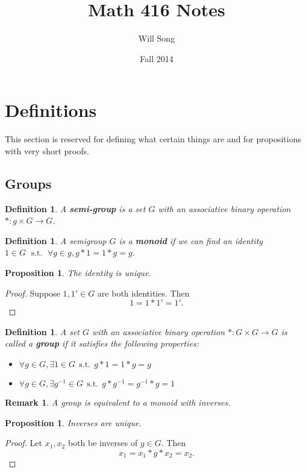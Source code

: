 \documentclass{article}
\title{Math 416 Notes}
\author{Will Song}
\date{Fall 2014}
\theoremstyle{norm}
\newtheorem{df}[thm]{Definition}
\newtheorem{rem}[thm]{Remark}
\newtheorem{prop}[thm]{Proposition}
\renewcommand{\st}{\,\operatorname{s.t.}\,}
\begin{document}
\maketitle
\newpage

\tableofcontents
\newpage

\section{Definitions}
This section is reserved for defining what certain things are and for
propositions with very short proofs.

\subsection{Groups}
\begin{df}
A \textbf{semi-group} is a set $G$ with an associative binary operation $* : g
\times G \rightarrow G$.
\end{df}

\begin{df}
A semigroup $G$ is a \textbf{monoid} if we can find an identity $1 \in G \, \st
\, \forall g \in g, g * 1 = 1 * g = g$.
\end{df}

\begin{prop}
The identity is unique.
\end{prop}
\begin{proof}
Suppose $1, 1' \in G$ are both identities. Then
\[ 1 = 1 * 1' = 1'. \]
\end{proof}

\begin{df}
A set $G$ with an associative binary operation $* : G \times G
\rightarrow G$ is called a \textbf{group} if it satisfies the following
properties:
\begin{itemize}
\item $\forall g \in G, \exists 1 \in G \st g * 1 = 1 * g = g$
\item $\forall g \in G, \exists g^{-1} \in G \st g * g^{-1} = g^{-1} * g
= 1$
\end{itemize}
\end{df}
\begin{rem}
A group is equivalent to a monoid with inverses.
\end{rem}
\begin{prop}
Inverses are unique.
\end{prop}
\begin{proof}
Let $x_1, x_2$ both be inverses of $g \in G$. Then
\[ x_1 = x_1 * g * x_2 = x_2. \]
\end{proof}
\end{document}
